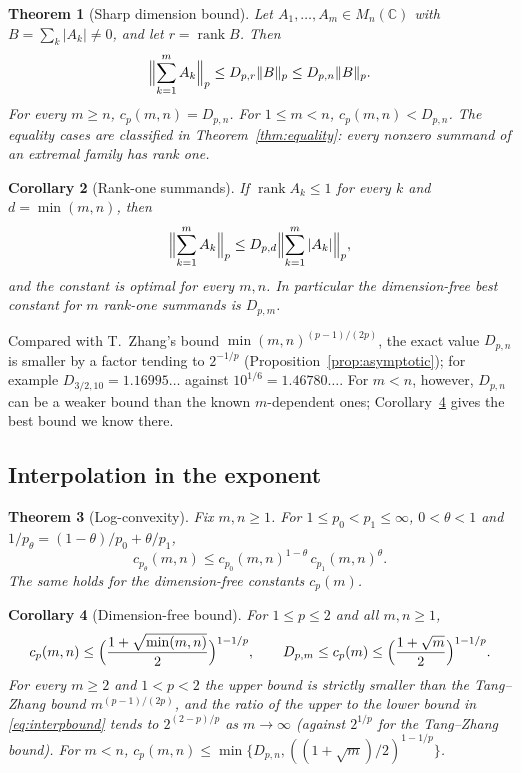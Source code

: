 \documentclass[11pt,a4paper]{article}
\numberwithin{equation}{section}
\newtheorem{theorem}{Theorem}[section]
\newtheorem{corollary}[theorem]{Corollary}
\theoremstyle{definition}
\theoremstyle{remark}
\DeclareMathOperator{\rank}{rank}
\newcommand{\C}{\mathbb C}
\begin{document}
\begin{theorem}[Sharp dimension bound]\label{thm:main}
Let \(A_1,\ldots,A_m\in M_n(\C)\) with \(B=\sum_k|A_k|\ne0\), and let
\(r=\rank B\). Then
\begin{equation}\label{eq:main}
 \Bigl\|\sum_{k=1}^{m}A_k\Bigr\|_p
 \le D_{p,r}\|B\|_p\le D_{p,n}\|B\|_p .
\end{equation}
For every \(m\ge n\), \(c_p(m,n)=D_{p,n}\). For \(1\le m<n\),
\(c_p(m,n)<D_{p,n}\). The equality cases are classified in
Theorem~\ref{thm:equality}: every nonzero summand of an extremal family
has rank one.
\end{theorem}

\begin{corollary}[Rank-one summands]\label{cor:rankone}
If \(\rank A_k\le1\) for every \(k\) and \(d=\min(m,n)\), then
\begin{equation}\label{eq:rankone}
 \Bigl\|\sum_{k=1}^{m}A_k\Bigr\|_p
 \le D_{p,d}\Bigl\|\sum_{k=1}^{m}|A_k|\Bigr\|_p,
\end{equation}
and the constant is optimal for every \(m,n\). In particular the
dimension-free best constant for \(m\) rank-one summands is \(D_{p,m}\).
\end{corollary}

Compared with T.~Zhang's bound \(\min(m,n)^{(p-1)/(2p)}\), the exact
value \(D_{p,n}\) is smaller by a factor tending to \(2^{-1/p}\)
(Proposition~\ref{prop:asymptotic}); for example
\(D_{3/2,10}=1.16995\ldots\) against \(10^{1/6}=1.46780\ldots\).
For \(m<n\), however, \(D_{p,n}\) can be a weaker bound than the known
\(m\)-dependent ones; Corollary~\ref{cor:interp} gives the best bound
we know there.

\subsection{Interpolation in the exponent}

\begin{theorem}[Log-convexity]\label{thm:interp}
Fix \(m,n\ge1\). For \(1\le p_0<p_1\le\infty\), \(0<\theta<1\) and
\(1/p_\theta=(1-\theta)/p_0+\theta/p_1\),
\[
 c_{p_\theta}(m,n)\le c_{p_0}(m,n)^{1-\theta}\,c_{p_1}(m,n)^{\theta}.
\]
The same holds for the dimension-free constants \(c_p(m)\).
\end{theorem}

\begin{corollary}[Dimension-free bound]\label{cor:interp}
For \(1\le p\le2\) and all \(m,n\ge1\),
\begin{equation}\label{eq:interpbound}
 c_p(m,n)\le\Bigl(\frac{1+\sqrt{\min(m,n)}}{2}\Bigr)^{1-1/p},
 \qquad
 D_{p,m}\le c_p(m)\le\Bigl(\frac{1+\sqrt m}{2}\Bigr)^{1-1/p}.
\end{equation}
For every \(m\ge2\) and \(1<p<2\) the upper bound is strictly smaller
than the Tang--Zhang bound \(m^{(p-1)/(2p)}\), and the ratio of the upper
to the lower bound in \eqref{eq:interpbound} tends to \(2^{(2-p)/p}\)
as \(m\to\infty\) (against \(2^{1/p}\) for the Tang--Zhang bound).
For \(m<n\), \(c_p(m,n)\le\min\{D_{p,n},((1+\sqrt m)/2)^{1-1/p}\}\).
\end{corollary}
\end{document}
